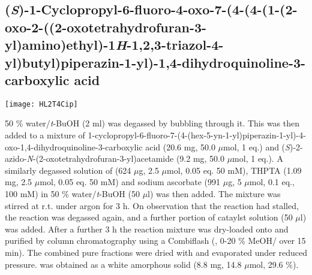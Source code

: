 {{{{{{{{\subsection{(\textit{S})-1-Cyclopropyl-6-fluoro-4-oxo-7-(4-(4-(1-(2-oxo-2-((2-oxotetrahydrofuran\hyp{}3\hyp{}yl)amino)ethyl)-1\textit{H}-1,2,3-triazol-4-yl)butyl)piperazin-1-yl)-1,4-dihydroquinoli\allowbreak ne-3-carboxylic acid }
	
	
	\begin{scheme}[H]
		\begin{center}
			\texttt{[image: HL2T4Cip]}
		\end{center}
	\end{scheme}

50 \% water/\textit{t}-BuOH (2 ml) was degassed by bubbling  through it. This was then added to a mixture of 1-cyclopropyl-6-fluoro-7-(4-(hex-5-yn-1-yl)piperazin-1-yl)-4-oxo-1,4\hyp{}dihydro\-quinoline-3-carboxylic acid  (20.6 mg, 50.0 $\mu$mol, 1 eq.) and (\textit{S})-2-azido-\textit{N}-(2-oxotetrahydrofuran-3-yl)acetamide  (9.2 mg, 50.0 $\mu$mol, 1 eq.).
A similarly degassed solution of  (624 $\mu$g, 2.5 $\mu$mol, 0.05 eq. 50 mM), THPTA (1.09 mg, 2.5 $\mu$mol, 0.05 eq. 50 mM) and sodium ascorbate (991 $\mu$g, 5 $\mu$mol, 0.1 eq., 100 mM) in 50 \% water/\textit{t}-BuOH (50 $\mu$l) was then added. 
The mixture was stirred at r.t. under argon for 3 h. On observation that the reaction had stalled, the reaction was degassed again, and a further portion of cataylst solution (50 $\mu$l) was added.
After a further 3 h the reaction mixture was dry-loaded onto  and purified by column chromatography using a Combiflash (, 0-20 \% MeOH/ over 15 min).
The combined pure fractions were dried with  and evaporated under reduced pressure.
 was obtained as a white amorphous solid (8.8 mg, 14.8 $\mu$mol, 29.6 \%).
\\[1\baselineskip]
\\[1\baselineskip]
}}}}}}}}

